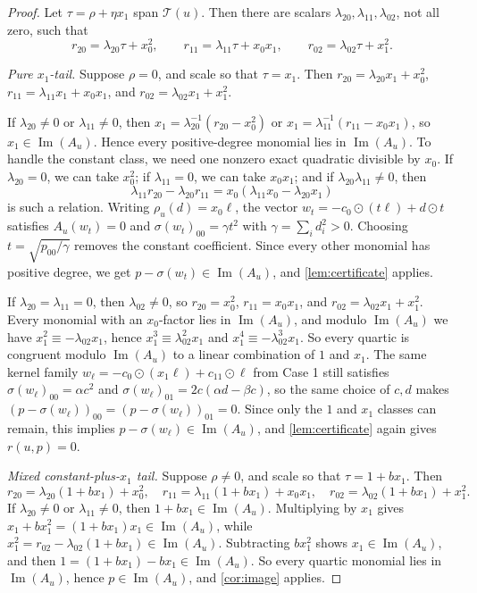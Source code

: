 \documentclass[10pt]{article}
\theoremstyle{definition}
\DeclareMathOperator{\imag}{Im}
\newcommand{\im}{\imag}
\newcommand{\sig}{\sigma}
\newcommand{\rel}{\rho}
\newcommand{\Tail}{\mathcal{T}}
\begin{document}
\begin{proof}
Let \(\tau=\rho+\eta x_1\) span \(\Tail(u)\). Then there are scalars
\(\lambda_{20},\lambda_{11},\lambda_{02}\), not all zero, such that
\[
  r_{20}=\lambda_{20}\tau+x_0^2,\qquad
  r_{11}=\lambda_{11}\tau+x_0x_1,\qquad
  r_{02}=\lambda_{02}\tau+x_1^2.
\]

\emph{Pure \(x_1\)-tail.} Suppose \(\rho=0\), and scale so that \(\tau=x_1\).
Then \(r_{20}=\lambda_{20}x_1+x_0^2\),
\(r_{11}=\lambda_{11}x_1+x_0x_1\), and
\(r_{02}=\lambda_{02}x_1+x_1^2\).

If \(\lambda_{20}\neq 0\) or \(\lambda_{11}\neq 0\), then
\(x_1=\lambda_{20}^{-1}(r_{20}-x_0^2)\) or
\(x_1=\lambda_{11}^{-1}(r_{11}-x_0x_1)\), so \(x_1\in \im(A_u)\). Hence every
positive-degree monomial lies in \(\im(A_u)\). To handle the constant class, we
need one nonzero exact quadratic divisible by \(x_0\). If \(\lambda_{20}=0\),
we can take \(x_0^2\); if \(\lambda_{11}=0\), we can take \(x_0x_1\); and if
\(\lambda_{20}\lambda_{11}\neq 0\), then
\[
  \lambda_{11}r_{20}-\lambda_{20}r_{11}
  =x_0(\lambda_{11}x_0-\lambda_{20}x_1)
\]
is such a relation. Writing \(\rel_u(d)=x_0\ell\), the vector
\(w_t=-c_0\odot (t\ell)+d\odot t\) satisfies \(A_u(w_t)=0\) and
\(\sig(w_t)_{00}=\gamma t^2\) with \(\gamma=\sum_i d_i^2>0\). Choosing
\(t=\sqrt{p_{00}/\gamma}\) removes the constant coefficient. Since every other
monomial has positive degree, we get \(p-\sig(w_t)\in \im(A_u)\), and
\cref{lem:certificate} applies.

If \(\lambda_{20}=\lambda_{11}=0\), then \(\lambda_{02}\neq 0\), so
\(r_{20}=x_0^2\), \(r_{11}=x_0x_1\), and
\(r_{02}=\lambda_{02}x_1+x_1^2\). Every monomial with an \(x_0\)-factor lies in
\(\im(A_u)\), and modulo \(\im(A_u)\) we have
\(x_1^2\equiv -\lambda_{02}x_1\), hence
\(x_1^3\equiv \lambda_{02}^2x_1\) and
\(x_1^4\equiv -\lambda_{02}^3x_1\). So every quartic is congruent modulo
\(\im(A_u)\) to a linear combination of \(1\) and \(x_1\). The same kernel
family \(w_\ell=-c_0\odot(x_1\ell)+c_{11}\odot \ell\) from Case 1 still
satisfies \(\sig(w_\ell)_{00}=\alpha c^2\) and
\(\sig(w_\ell)_{01}=2c(\alpha d-\beta c)\), so the same choice of \(c,d\) makes
\((p-\sig(w_\ell))_{00}=(p-\sig(w_\ell))_{01}=0\). Since only the \(1\) and
\(x_1\) classes can remain, this implies \(p-\sig(w_\ell)\in \im(A_u)\), and
\cref{lem:certificate} again gives \(r(u,p)=0\).

\emph{Mixed constant-plus-\(x_1\) tail.} Suppose \(\rho\neq 0\), and scale so
that \(\tau=1+b x_1\). Then
\[
  r_{20}=\lambda_{20}(1+b x_1)+x_0^2,\quad
  r_{11}=\lambda_{11}(1+b x_1)+x_0x_1,\quad
  r_{02}=\lambda_{02}(1+b x_1)+x_1^2.
\]
If \(\lambda_{20}\neq 0\) or \(\lambda_{11}\neq 0\), then \(1+b x_1\in
\im(A_u)\). Multiplying by \(x_1\) gives
\(x_1+b x_1^2=(1+b x_1)x_1\in \im(A_u)\), while
\(x_1^2=r_{02}-\lambda_{02}(1+b x_1)\in \im(A_u)\). Subtracting \(b x_1^2\)
shows \(x_1\in \im(A_u)\), and then \(1=(1+b x_1)-b x_1\in \im(A_u)\). So every
quartic monomial lies in \(\im(A_u)\), hence \(p\in \im(A_u)\), and
\cref{cor:image} applies.


\end{proof}
\end{document}

